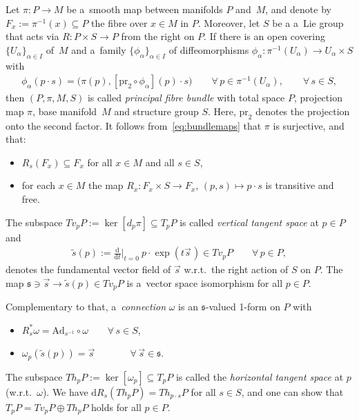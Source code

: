 \documentclass[11pt]{article}
\numberwithin{equation}{section}
\newcommand{\dttB}[2]{{\textstyle\frac{\mathrm{d}}{\mathrm{d}#1}}\big|_{#1=#2}}
\newcommand{\wt}[1]{\widetilde{#1}}
\newcommand{\Add}[1]{\mathrm{Ad}_{#1}}
\begin{document}
Let $\pi\colon P\rightarrow M$ be a~smooth map between manifolds $P$ and~$M$, and denote by
$F_x:=\pi^{-1}(x)\subseteq P$ the f\/ibre over $x\in M$ in $P$.
Moreover, let $S$ be a a~Lie group that acts via $R\colon P\times S\rightarrow P$ from the right on $P$.
If there is an open covering $\{U_\alpha\}_{\alpha\in I}$ of~$M$ and a~family $\{\phi_\alpha\}_{\alpha\in I}$ of
dif\/feomorphisms $\phi_\alpha\colon \pi^{-1}(U_\alpha)\rightarrow U_\alpha\times S$ with
\begin{gather}
\label{eq:bundlemaps}
\phi_\alpha(p\cdot s)=\big(\pi(p),[\mathrm{pr}_2\circ\phi_\alpha](p)\cdot s\big)
\qquad\forall\, p\in \pi^{-1}(U_\alpha),\qquad\forall\, s\in S,
\end{gather}
then $(P,\pi,M,S)$ is called \emph{principal fibre bundle} with total space $P$,
projection map $\pi$, base manifold~$M$ and structure group $S$.
Here, $\mathrm{pr}_2$
denotes the projection onto the second factor.
It follows from~\eqref{eq:bundlemaps} that $\pi$ is surjective, and that:
\begin{itemize}\itemsep=0pt
\item
$R_s(F_x)\subseteq F_x$ for all $x\in M$ and all $s\in S$,
\item
for each $x\in M$ the map $R_x\colon F_x \times S\rightarrow F_x$, $(p,s)\mapsto p\cdot s$ is transitive and free.
\end{itemize}
The subspace $Tv_pP:=\ker[d_p\pi]\subseteq T_pP$ is called \emph{vertical tangent
space} at $p\in P$ and
\begin{gather*}
\wt{s}(p):=\dttB{t}{0}\: p\cdot \exp(t\vec{s}\hspace{1pt})\in Tv_pP
\qquad\forall\, p\in P,
\end{gather*}
denotes the fundamental vector f\/ield of $\vec{s}$ w.r.t.~the right action of $S$ on
$P$.
The map $\mathfrak{s}\ni\vec{s}\rightarrow \wt{s}(p)\in Tv_pP$ is a~vector space isomorphism for all $p\in P$.

Complementary to that, a~\emph{connection} $\omega$ is an $\mathfrak{s}$-valued 1-form on $P$ with \begin{itemize}\itemsep=0pt
\item
$R_s^{*}\omega= \Add{s^{-1}}\circ \omega\qquad \forall\,s\in S$,
\item
$\omega_p(\wt{s}(p))=\vec{s}\hspace{44pt}\forall\,\vec{s}\in \mathfrak{s}$.
\end{itemize}
The subspace $Th_pP:=\ker[\omega_p]\subseteq T_pP$ is called the \emph{horizontal
tangent space} at $p$ (w.r.t.~$\omega$).
We have $\mathrm{d} R_s(Th_pP)=Th_{p\cdot s}P$ for all $s\in S$, and one can show that $T_pP= Tv_pP\oplus Th_pP$ holds for all
$p\in P$.
\end{document}
